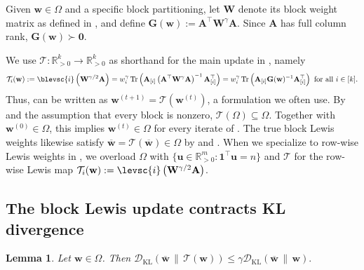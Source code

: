 \documentclass[11pt]{article}
\theoremstyle{plain}
\newtheorem{lemma}[lemma]{Lemma}
\numberwithin{equation}{section}
\newcommand{\R}{\mathbb{R}}
\newcommand{\one}{\mathbf{1}}
\newcommand{\Tr}{\operatorname{Tr}}
\newcommand{\Rmspos}{\mathbb{R}^m_{>0}}
\newcommand{\Rkpos}{\mathbb{R}_{>0}^k}
\newcommand{\bA}{\mathbf{A}}
\newcommand{\bG}{\mathbf{G}}
\newcommand{\bW}{\mathbf{W}}
\newcommand{\bzero}{\mathbf{0}}
\newcommand{\bw}{\mathbf{w}}
\newcommand{\bu}{\mathbf{u}}
\newcommand{\bwbar}{\overline{\mathbf{w}}}
\newcommand{\bAblk}[1]{\mathbf{A}_{[#1]}}
\newcommand{\calT}{\mathcal{T}}
\newcommand{\omrp}{\gamma}
\newcommand{\kldiv}[2]{\mathcal{D}_{\mathrm{KL}}\left(#1 \,\|\, #2\right)}
\begin{document}
Given $\bw\in\Omega$ and a specific block partitioning, let $\bW$ denote its block weight matrix as defined in , and define  $\bG(\bw):=\bA^\top\bW^\omrp\bA$. Since $\bA$ has full column rank, $\bG(\bw)\succ\bzero$.

We use $\calT:\R_{>0}^k\to\Rkpos$ as shorthand for the main update in , namely
\[
\calT_i(\bw)
:=
\blevsc{i}\left(\bW^{\omrp/2}\bA\right)
=
w_i^\omrp
\Tr\left(
\bAblk{i}
\left(\bA^\top\bW^\omrp\bA\right)^{-1}
\bAblk{i}^\top
\right) = w_i^\omrp \Tr\left(\bAblk{i}\bG(\bw)^{-1}\bAblk{i}^\top\right)
\text{ for all }i\in[k].
\]
Thus,  can be written as $\bw^{(t+1)}=\calT(\bw^{(t)})$, a formulation we often use. By  and the assumption that every block is nonzero, $\calT(\Omega)\subseteq\Omega$. Together with $\bw^{(0)}\in\Omega$, this implies $\bw^{(t)}\in\Omega$ for every iterate of . The true block Lewis weights likewise satisfy $\bwbar=\calT(\bwbar)\in\Omega$ by  and .
When we specialize to row-wise Lewis weights in , we overload $\Omega$ with $\{\bu\in\Rmspos:\one^\top\bu=n\}$ and $\calT$ for the row-wise Lewis map $\calT_i(\bw):=\levsc{i}\left(\bW^{\omrp/2}\bA\right)$.

\subsection{The block Lewis update contracts KL divergence}
\label{sec:kl-decay}

\begin{lemma}
\label{lem:kl-contraction}
Let  $\bw\in\Omega$. Then  $\kldiv{\bwbar}{\calT(\bw)}
    \leq
    \omrp\kldiv{\bwbar}{\bw}.$
\end{lemma}
\end{document}
